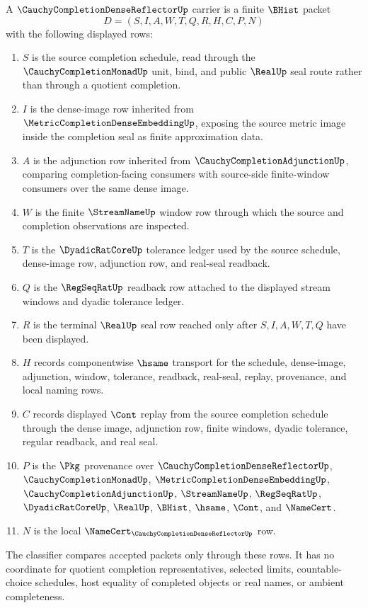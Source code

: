 \begin{definition}
\label{def:cauchy-completion-dense-reflector-carrier}
A $\CauchyCompletionDenseReflectorUp$ carrier is a finite $\BHist$ packet
$$
D=(S,I,A,W,T,Q,R,H,C,P,N)
$$
with the following displayed rows:
\begin{enumerate}
\item $S$ is the source completion schedule, read through the $\CauchyCompletionMonadUp$ unit, bind, and public $\RealUp$ seal route rather than through a quotient completion.
\item $I$ is the dense-image row inherited from $\MetricCompletionDenseEmbeddingUp$, exposing the source metric image inside the completion seal as finite approximation data.
\item $A$ is the adjunction row inherited from $\CauchyCompletionAdjunctionUp$, comparing completion-facing consumers with source-side finite-window consumers over the same dense image.
\item $W$ is the finite $\StreamNameUp$ window row through which the source and completion observations are inspected.
\item $T$ is the $\DyadicRatCoreUp$ tolerance ledger used by the source schedule, dense-image row, adjunction row, and real-seal readback.
\item $Q$ is the $\RegSeqRatUp$ readback row attached to the displayed stream windows and dyadic tolerance ledger.
\item $R$ is the terminal $\RealUp$ seal row reached only after $S,I,A,W,T,Q$ have been displayed.
\item $H$ records componentwise $\hsame$ transport for the schedule, dense-image, adjunction, window, tolerance, readback, real-seal, replay, provenance, and local naming rows.
\item $C$ records displayed $\Cont$ replay from the source completion schedule through the dense image, adjunction row, finite windows, dyadic tolerance, regular readback, and real seal.
\item $P$ is the $\Pkg$ provenance over $\CauchyCompletionDenseReflectorUp$, $\CauchyCompletionMonadUp$, $\MetricCompletionDenseEmbeddingUp$, $\CauchyCompletionAdjunctionUp$, $\StreamNameUp$, $\RegSeqRatUp$, $\DyadicRatCoreUp$, $\RealUp$, $\BHist$, $\hsame$, $\Cont$, and $\NameCert$.
\item $N$ is the local $\NameCert_{\CauchyCompletionDenseReflectorUp}$ row.
\end{enumerate}
The classifier compares accepted packets only through these rows. It has no coordinate for quotient completion representatives, selected limits, countable-choice schedules, host equality of completed objects or real names, or ambient completeness.
\end{definition}

